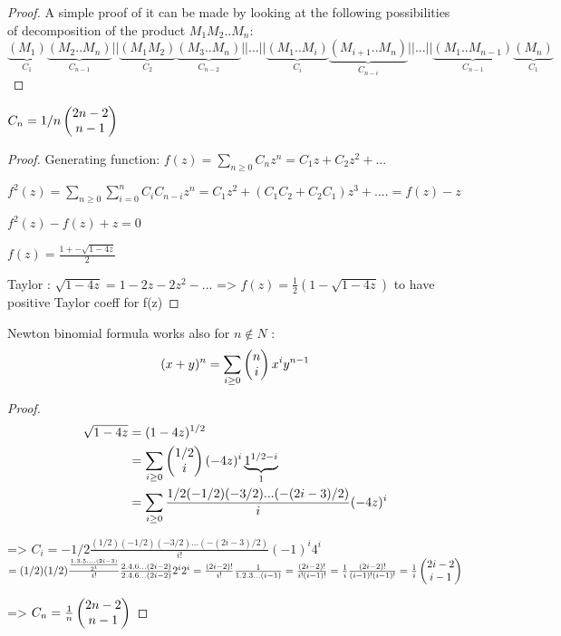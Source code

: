 \begin{proof} A simple proof of it can be made by looking at the following possibilities of decomposition of the product $M_1M_2..M_n$: 
$$\underbrace{(M_1)}_{C_1}\underbrace{(M_2..M_n)}_{C_{n-1}} || \underbrace{(M_1M_2)}_{C_2}\underbrace{(M_3..M_n)}_{C_{n-2}}|| ...|| \underbrace{(M_1..M_i)}_{C_i}\underbrace{(M_{i+1}..M_n)}_{C_{n-i}}|| ...|| \underbrace{(M_1..M_{n-1})}_{C_{n-1}}\underbrace{(M_n)}_{C_1}$$
\end{proof}

\begin{theorem}
$C_n = 1/n \left( \begin{matrix} 2n-2\\ n-1\end{matrix} \right)$
\end{theorem}

\begin{proof}
Generating function:
$f(z) = \sum_{n\geq 0} C_n z^n = C_1z+C_2z^2 +...$

$f^2(z) = \sum_{n \geq 0}\sum_{i=0}^{n}C_i C_{n-i} z^n = C_1z^2+(C_1C_2+C_2C_1)z^3+....=f(z) - z$

$f^2(z)-f(z)+z = 0$

$f(z)=\frac{1+- \sqrt{1-4z}}{2}$

Taylor : $\sqrt{1-4z}  = 1-2z-2z^2-...$
=> $f(z) = \frac{1}{2}(1-\sqrt{1-4z})$ to have positive Taylor coeff for f(z)
\end{proof}

\begin{theorem}
Newton binomial formula works also for $n\not\in N$ : $$(x+y)^n = \sum_{i\geq 0} \left( \begin{matrix} n\\ i\end{matrix} \right) x^i y^{n-1}$$
\end{theorem}

\begin{proof}
\begin{align*}
\sqrt{1-4z} &= (1-4z)^{1/2}\\
&= \sum_{i\geq 0} \left( \begin{matrix} 1/2\\ i\end{matrix} \right)(-4z)^i \underbrace{1^{1/2-i}}_{1}\\
&= \sum_{i\geq 0} \frac{1/2(-1/2)(-3/2) ... (-(2i-3)/2)}{i} (-4z)^i
\end{align*}

=> $C_i = -1/2 \frac{(1/2)(-1/2)(-3/2)...(-(2i-3)/2)}{i!} (-1)^i 4^i$
$ =  (1/2) (1/2) \frac{\frac{1.3.5....(2i-3)}{2^i}}{i!}\frac{2.4.6...(2i-2)}{2.4.6...(2i-2)} 2^i 2^i = \frac{(2i-2)!}{i!}\frac{1}{1.2.3...(i-1)}=\frac{(2i-2)!}{i!(i-1)!} = \frac{1}{i}\frac{(2i-2)!}{(i-1)!(i-1)!}= \frac{1}{i}\left( \begin{matrix} 2i-2\\ i-1\end{matrix} \right)$

=> $C_n = \frac{1}{n}\left( \begin{matrix} 2n-2\\ n-1\end{matrix} \right)$
\end{proof}

